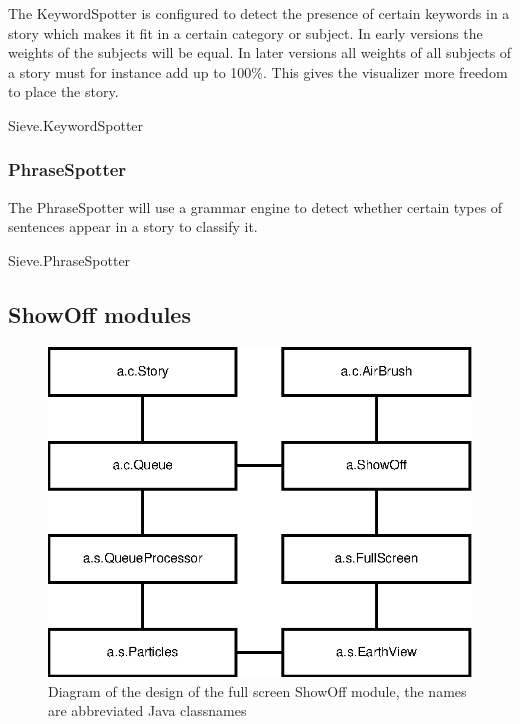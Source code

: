 The KeywordSpotter is configured to detect the presence of certain keywords in
a story which makes it fit in a certain category or subject. In early versions
the weights of the subjects will be equal. In later versions all weights of all
subjects of a story must for instance add up to 100\%. This gives the
visualizer more freedom to place the story.

\begin{module}{Sieve.KeywordSpotter}
\end{module}

\subsubsection{PhraseSpotter}

The PhraseSpotter will use a grammar engine to detect whether certain types of
sentences appear in a story to classify it.

\begin{module}{Sieve.PhraseSpotter}
\end{module}

\subsection{ShowOff modules}

\begin{figure}
    \centering
    \includegraphics{image/showoff-fullscreen}
    \caption{Diagram of the design of the full screen ShowOff module, the names are abbreviated Java classnames}
\end{figure}

